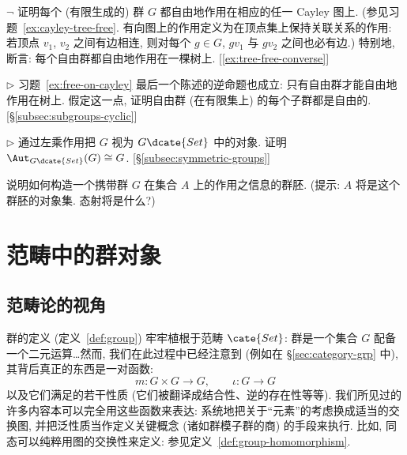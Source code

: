 \begin{prob}
\label{ex:free-on-cayley}
$\neg$ 证明每个 (有限生成的) 群 $G$ 都自由地作用在相应的任一 Cayley 图上. (参见习题~\ref{ex:cayley-tree-free}. 有向图上的作用定义为在顶点集上保持关联关系的作用: 若顶点 $v_1$, $v_2$ 之间有边相连, 则对每个 $g \in G$, $gv_1$ 与 $gv_2$ 之间也必有边.) 特别地, 断言: 每个自由群都自由地作用在一棵树上. [\ref{ex:tree-free-converse}]
\end{prob}

\begin{prob}
\label{ex:tree-free-converse}
$\triangleright$ 习题~\ref{ex:free-on-cayley} 最后一个陈述的逆命题也成立: 只有自由群才能自由地作用在树上. 假定这一点, 证明自由群 (在有限集上) 的每个子群都是自由的. [\S\ref{subsec:subgroups-cyclic}]
\end{prob}

\begin{prob}
\label{ex:aut-gset}
$\triangleright$ 通过左乘作用把 $G$ 视为 $G\dcate{Set}$ 中的对象. 证明 $\Aut_{G\dcate{Set}}(G) \cong G$. [\S\ref{subsec:symmetric-groups}]
\end{prob}

\begin{prob}
\label{ex:action-groupoid}
说明如何构造一个携带群 $G$ 在集合 $A$ 上的作用之信息的群胚. (提示: $A$ 将是这个群胚的对象集. 态射将是什么?)
\end{prob}

\section{范畴中的群对象}
\label{subsec:group-objects}

\subsection{范畴论的视角}
\label{subsec:categorical-viewpoint}

群的定义 (定义~\ref{def:group}) 牢牢植根于范畴 $\cate{Set}$: 群是一个集合 $G$ 配备一个二元运算\ldots 然而, 我们在此过程中已经注意到 (例如在 \S\ref{sec:category-grp} 中), 其背后真正的东西是一对函数:
\[
m : G \times G \rightarrow G, \qquad \iota : G \rightarrow G
\]
以及它们满足的若干性质 (它们被翻译成结合性、逆的存在性等等). 我们所见过的许多内容本可以完全用这些函数来表达: 系统地把关于``元素''的考虑换成适当的交换图, 并把泛性质当作定义关键概念 (诸如群模子群的商) 的手段来执行. 比如, 同态可以纯粹用图的交换性来定义: 参见定义~\ref{def:group-homomorphism}.

